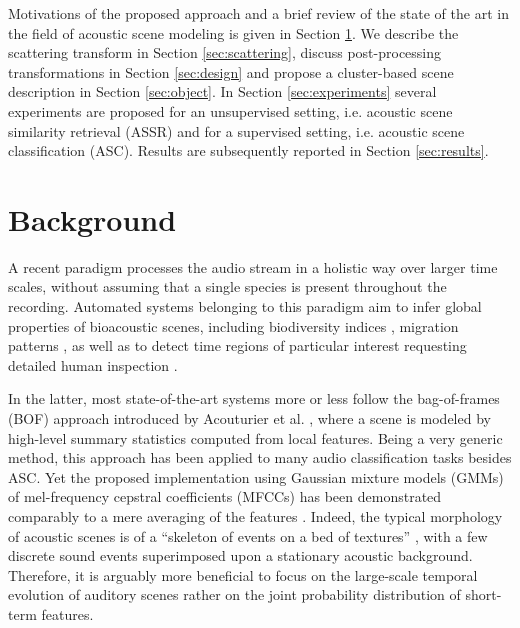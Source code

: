 \documentclass[journal]{IEEEtran}
\makeatletter
\newcommand*{\ie}{i.e.\@\xspace}
\makeatother
\begin{document}
Motivations of the proposed approach and a brief review of the state of the art in the field of acoustic scene modeling is given in Section \ref{sec:soa}. We describe the scattering transform in Section \ref{sec:scattering}, discuss post-processing transformations in Section \ref{sec:design} and propose a cluster-based scene description in Section \ref{sec:object}. In Section \ref{sec:experiments} several experiments are proposed for an unsupervised setting, \ie acoustic scene similarity retrieval (ASSR) and for a supervised setting, \ie acoustic scene classification (ASC). Results are subsequently reported in Section \ref{sec:results}.

\section{Background} \label{sec:soa}


A recent paradigm processes the audio stream in a holistic way over larger time scales, without assuming that a single species is present throughout the recording. Automated systems belonging to this paradigm aim to infer global properties of bioacoustic scenes, including biodiversity indices \cite{Bardeli2010}, migration patterns \cite{Obrist2010}, as well as to detect time regions of particular interest requesting detailed human inspection \cite{rosenstock2002landbird,diefenbach2007incorporating}.

In the latter, most state-of-the-art systems more or less follow the bag-of-frames (BOF) approach introduced by Acouturier et al. \cite{aucouturier2007bag}, where a scene is modeled by high-level summary statistics computed from local features.
Being a very generic method, this approach has been applied to many audio classification tasks besides ASC.
Yet the proposed implementation using Gaussian mixture models (GMMs) of mel-frequency cepstral coefficients (MFCCs) has been demonstrated comparably to a mere averaging of the features \cite{lagrange:hal-01082501}.
Indeed, the typical morphology of acoustic scenes is of a ``skeleton of events on a bed of textures'' \cite{nelken2013}, with a few discrete sound events superimposed upon a stationary acoustic background.
Therefore, it is arguably more beneficial to focus on the large-scale temporal evolution of auditory scenes rather on the joint probability distribution of short-term features.
\end{document}
